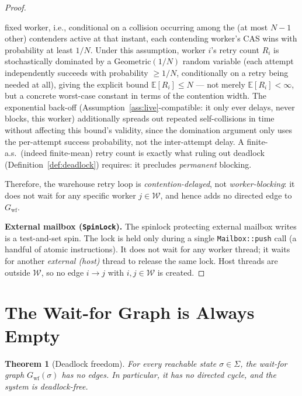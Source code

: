 \documentclass[11pt,a4paper]{report}
\newtheorem{theorem}{Theorem}[section]
\newcommand{\code}[1]{\texttt{#1}}
\begin{document}
\begin{proof}
\begin{itemize}
        fixed worker, i.e., conditional on a collision occurring among
        the (at most $N-1$ other) contenders active at that instant,
        each contending worker's CAS wins with probability at least
        $1/N$. Under this assumption, worker $i$'s retry count $R_i$ is
        stochastically dominated by a $\mathrm{Geometric}(1/N)$ random
        variable (each attempt independently succeeds with probability
        $\geq 1/N$, conditionally on a retry being needed at all), giving
        the explicit bound $\mathbb{E}[R_i] \leq N$ --- not merely
        $\mathbb{E}[R_i]<\infty$, but a concrete worst-case constant in
        terms of the contention width. The exponential back-off
        (Assumption~\ref{ass:live}-compatible: it only ever delays,
        never blocks, this worker) additionally spreads out repeated
        self-collisions in time without affecting this bound's validity,
        since the domination argument only uses the per-attempt success
        probability, not the inter-attempt delay.
        A finite-a.s.\ (indeed finite-mean) retry count is exactly what
        ruling out deadlock (Definition~\ref{def:deadlock}) requires: it
        precludes \emph{permanent} blocking.
\end{itemize}
Therefore, the warehouse retry loop is \emph{contention-delayed}, not
\emph{worker-blocking}: it does not wait for any specific worker
$j \in \mathcal{W}$, and hence adds no directed edge to $G_{\text{wf}}$.

\medskip
\textbf{External mailbox (\code{SpinLock}).}
The spinlock protecting external mailbox writes is a test-and-set
spin.  The lock is held only during a single \code{Mailbox::push}
call (a handful of atomic instructions).  It does not wait for any
worker thread; it waits for another \emph{external (host)} thread
to release the same lock.  Host threads are outside $\mathcal{W}$,
so no edge $i \to j$ with $i, j \in \mathcal{W}$ is created.
\end{proof}

\section{The Wait-for Graph is Always Empty}

\begin{theorem}[Deadlock freedom]
\label{thm:deadlock}
For every reachable state $\sigma \in \Sigma$, the wait-for graph
$G_{\text{wf}}(\sigma)$ has no edges.  In particular, it has no
directed cycle, and the system is deadlock-free.
\end{theorem}
\end{document}
